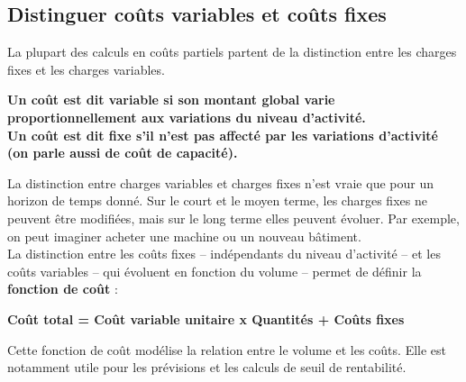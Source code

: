 \documentclass{kaobook}
\begin{document}
\subsection{Distinguer coûts variables et coûts fixes}
\label{sec:org56b4fb5}
La plupart des calculs en coûts partiels partent de la distinction entre les charges fixes et les charges variables.\\
\begin{center}
\textbf{Un coût est dit variable si son montant global varie proportionnellement aux variations du niveau d'activité.}\\
\textbf{Un coût est dit fixe s'il n'est pas affecté par les variations d'activité (on parle aussi de coût de capacité).}\\
\end{center}
La distinction entre charges variables et charges fixes n'est vraie que pour un horizon de temps donné. Sur le court et le moyen terme, les charges fixes ne peuvent être modifiées, mais sur le long terme elles peuvent évoluer. Par exemple, on peut imaginer acheter une machine ou un nouveau bâtiment.\\
La distinction entre les coûts fixes – indépendants du niveau d'activité – et les coûts variables – qui évoluent en fonction du volume – permet de définir la \textbf{fonction de coût} :\\
\begin{center}
\textbf{Coût total = Coût variable unitaire x Quantités + Coûts fixes}\\
\end{center}
Cette fonction de coût modélise la relation entre le volume et les coûts. Elle est notamment utile pour les prévisions et les calculs de seuil de rentabilité.\\
\end{document}
